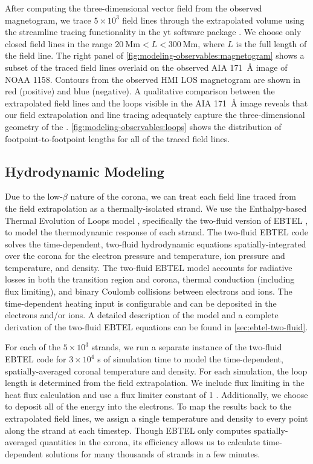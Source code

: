 After computing the three-dimensional vector field from the observed magnetogram, we trace $5\times10^3$ field lines through the extrapolated volume using the streamline tracing functionality in the yt software package \citep{turk_yt_2011}. We choose only closed field lines in the range $\SI{20}{\mega\m}<L<\SI{300}{\mega\m}$, where $L$ is the full length of the field line. The right panel of \autoref{fig:modeling-observables:magnetogram} shows a subset of the traced field lines overlaid on the observed AIA \SI{171}{\angstrom} image of NOAA 1158. Contours from the observed HMI LOS magnetogram are shown in red (positive) and blue (negative). A qualitative comparison between the extrapolated field lines and the loops visible in the AIA \SI{171}{\angstrom} image reveals that our field extrapolation and line tracing adequately capture the three-dimensional geometry of the \AR{}. \autoref{fig:modeling-observables:loops} shows the distribution of footpoint-to-footpoint lengths for all of the traced field lines.

\subsection{Hydrodynamic Modeling}\label{sec:modeling-observables:loops}

Due to the low-$\beta$ nature of the corona, we can treat each field line traced from the field extrapolation as a thermally-isolated strand. We use the Enthalpy-based Thermal Evolution of Loops model \citep[EBTEL,][]{klimchuk_highly_2008,cargill_enthalpy-based_2012,cargill_enthalpy-based_2012-1}, specifically the two-fluid version of EBTEL \citep{barnes_inference_2016}, to model the thermodynamic response of each strand. The two-fluid EBTEL code solves the time-dependent, two-fluid hydrodynamic equations spatially-integrated over the corona for the electron pressure and temperature, ion pressure and temperature, and density. The two-fluid EBTEL model accounts for radiative losses in both the transition region and corona, thermal conduction (including flux limiting), and binary Coulomb collisions between electrons and ions. The time-dependent heating input is configurable and can be deposited in the electrons and/or ions. A detailed description of the model and a complete derivation of the two-fluid EBTEL equations can be found in \autoref{sec:ebtel-two-fluid}.

For each of the $5\times10^3$ strands, we run a separate instance of the two-fluid EBTEL code for $3\times10^4$ s of simulation time to model the time-dependent, spatially-averaged coronal temperature and density. For each simulation, the loop length is determined from the field extrapolation. We include flux limiting in the heat flux calculation and use a flux limiter constant of 1 \citep[see Eqs. 21 and 22 of][]{klimchuk_highly_2008}. Additionally, we choose to deposit all of the energy into the electrons. To map the results back to the extrapolated field lines, we assign a single temperature and density to every point along the strand at each timestep. Though EBTEL only computes spatially-averaged quantities in the corona, its efficiency allows us to calculate time-dependent solutions for many thousands of strands in a few minutes.

